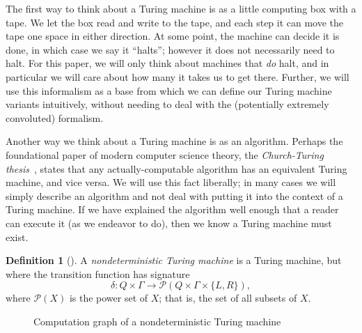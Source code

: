 \documentclass[english,12pt]{reedthesis}
\theoremstyle{plain}
\theoremstyle{definition}
\newtheorem{defn}[defn]{Definition}
\theoremstyle{remark}
\begin{document}
The first way to think about a Turing machine is as a little computing box with
a tape. We let the box read and write to the tape, and each step it can move the
tape one space in either direction. At some point, the machine can decide it is
done, in which case we say it ``halts''; however it does not necessarily need to
halt. For this paper, we will only think about machines that \emph{do} halt, and
in particular we will care about how many it takes us to get there. Further, we
will use this informalism as a base from which we can define our Turing machine
variants intuitively, without needing to deal with the (potentially extremely
convoluted) formalism.

Another way we think about a Turing machine is as an algorithm. Perhaps the
foundational paper of modern computer science theory, the \emph{Church-Turing
  thesis}~\cite{Tur36}, states that any actually-computable algorithm has an
equivalent Turing machine, and vice versa. We will use this fact liberally; in
many cases we will simply describe an algorithm and not deal with putting it
into the context of a Turing machine. If we have explained the algorithm well
enough that a reader can execute it (as we endeavor to do), then we know a
Turing machine must exist.

\begin{defn}[{\cite[178]{Sip97}}]%
  \label{def:nondeterministic-tm}
  A \emph{nondeterministic Turing machine} is a Turing machine, but where the
  transition function has signature
  \begin{equation*}
    \delta\colon Q \times \Gamma \rightarrow \mathcal{P}(Q \times \Gamma \times \{L, R\}),
  \end{equation*}
  where $\mathcal{P}(X)$ is the power set of $X$; that is, the set of all subsets of $X$.
\end{defn}

\begin{figure}[htbp]
  \centering
  \caption{Computation graph of a nondeterministic Turing machine}\label{fig:ntm}
\end{figure}
\end{document}
